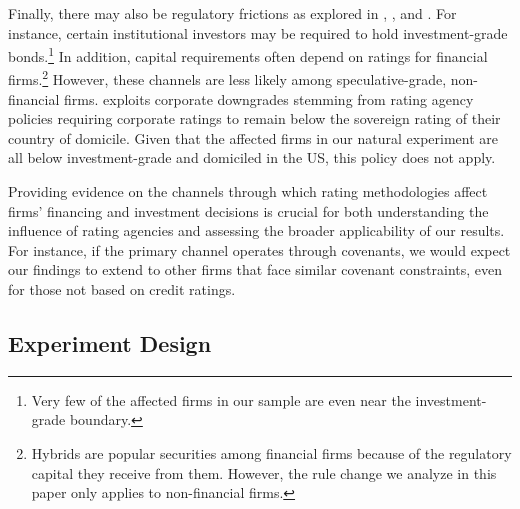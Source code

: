 \documentclass[a4paper, 12pt]{article}
\begin{document}
Finally, there may also be regulatory frictions as explored in \cite{bruno2015does}, \cite{kisgen2010regulations}, \cite{almeida2017real} and \cite{bernstein2017costs}. For instance, certain institutional investors may be required to hold investment-grade bonds.\footnote{Very few of the affected firms in our sample are even near the investment-grade boundary.} In addition, capital requirements often depend on ratings for financial firms.\footnote{Hybrids are popular securities among financial firms because of the regulatory capital they receive from them. However, the rule change we analyze in this paper only applies to non-financial firms.} However, these channels are less likely among speculative-grade, non-financial firms. \cite{almeida2017real} exploits corporate downgrades stemming from rating agency policies requiring corporate ratings to remain below the sovereign rating of their country of domicile. Given that the affected firms in our natural experiment are all below investment-grade and domiciled in the US, this policy does not apply.

Providing evidence on the channels through which rating methodologies affect firms’ financing and investment decisions is crucial for both understanding the influence of rating agencies and assessing the broader applicability of our results. For instance, if the primary channel operates through covenants, we would expect our findings to extend to other firms that face similar covenant constraints, even for those not based on credit ratings.


\subsection{Experiment Design} \label{sec_experiment}
\end{document}
